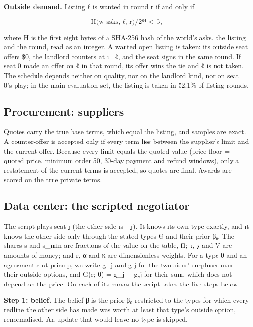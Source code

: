 \textbf{Outside demand.} Listing ℓ is wanted in round r if and only if

\[ \text{H(w-asks, ℓ, r)/2⁶⁴ < β,} \tag{B.2} \]

where H is the first eight bytes of a SHA-256 hash of the world's asks, the listing and the round, read as an
integer. A wanted open listing is taken: its outside seat offers \$0, the landlord counters at τ\_ℓ, and the seat
signs in the same round. If seat 0 made an offer on ℓ in that round, its offer wins the tie and ℓ is not taken. The
schedule depends neither on quality, nor on the landlord kind, nor on seat 0's play; in the main evaluation set, the
listing is taken in 52.1\% of listing-rounds.

\subsection{Procurement: suppliers}\label{procurement-suppliers}

Quotes carry the true base terms, which equal the listing, and samples are exact. A counter-offer is
accepted only if every term lies between the supplier's limit and the current offer. Because every limit equals the
quoted value (price floor = quoted price, minimum order 50, 30-day payment and refund windows), only a restatement
of the current terms is accepted, so quotes are final. Awards are scored on the true private terms.

\subsection{Data center: the scripted negotiator}\label{data-center-the-scripted-negotiator}

The script plays seat j (the other side is −j). It knows its own type exactly, and it knows the other side only
through the stated types Θ and their prior β₀. The shares s and s\_min are fractions of the value on the table, Π;
τ, χ and V are amounts of money; and r, α and κ are dimensionless weights. For a type θ and an agreement c at price
p, we write g\_j and g₋j for the two sides' surpluses over their outside options, and G(c; θ) = g\_j + g₋j for their
sum, which does not depend on the price. On each of its moves the script takes the five steps below.

\textbf{Step 1: belief.} The belief β is the prior β₀ restricted to the types for which every redline the other side has
made was worth at least that type's outside option, renormalised. An update that would leave no type is skipped.

